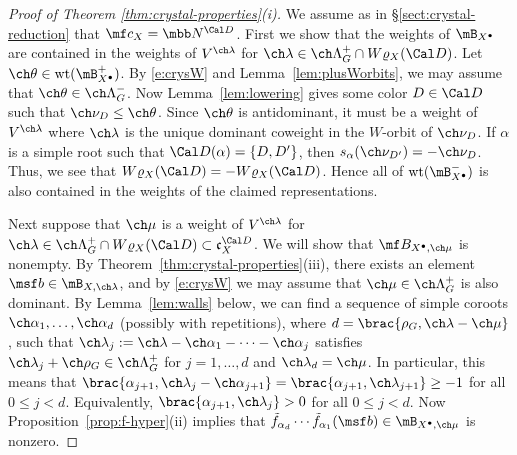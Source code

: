 \begin{proof}[Proof of Theorem \ref{thm:crystal-properties}(i)]
We assume as in \S\ref{sect:crystal-reduction} that $\mf c_X = \mbb N^{\Cal D}$.
First we show that the weights of $\mB_{X^\bullet}$ are contained in the weights of
$V^{\ch\lambda}$ for $\ch\lambda \in \ch\Lambda^+_G \cap W\varrho_X(\Cal D)$.
Let $\ch\theta \in \mathrm{wt}(\mB_{X^\bullet}^+)$.
By \eqref{e:crysW} and Lemma~\ref{lem:plusWorbits},
we may assume that $\ch\theta \in \ch\Lambda^-_G$.
Now Lemma~\ref{lem:lowering} gives some color $D\in \Cal D$ such that
$\ch\nu_D \le \ch\theta$. Since $\ch\theta$ is antidominant,
it must be a weight of $V^{\ch\lambda}$ where $\ch\lambda$ is the unique dominant coweight in
the $W$-orbit of $\ch\nu_D$.
If $\alpha$ is a simple root such that $\Cal D(\alpha) = \{ D, D' \}$, then
$s_\alpha(\ch\nu_{D'}) = -\ch\nu_D$. Thus, we see that
$W\varrho_X(\Cal D) = -W\varrho_X(\Cal D)$. Hence all of $\mathrm{wt}(\mB_{X^\bullet}^-)$
is also contained in the weights of the claimed representations.

Next suppose that $\ch\mu$ is a weight of $V^{\ch\lambda}$ for $\ch\lambda \in \ch\Lambda^+_G \cap W\varrho_X(\Cal D) \subset \mathfrak c_X^{\Cal D}$.
We will show that $\mf B_{X^\bullet,\ch\mu}$ is nonempty.
By Theorem~\ref{thm:crystal-properties}(iii), there exists
an element $\msf b \in \mB_{X,\ch\lambda}$, and
by \eqref{e:crysW} we may assume that
$\ch\mu \in \ch\Lambda^+_G$ is also dominant.
By Lemma~\ref{lem:walls} below,
we can find a sequence of simple coroots $\ch\alpha_1,\dotsc, \ch\alpha_d$
(possibly with repetitions), where $d = \brac{\rho_G,\ch\lambda-\ch\mu}$,
such that $\ch\lambda_j := \ch\lambda-\ch\alpha_1-\dotsb-\ch\alpha_j$
satisfies $\ch\lambda_j + \ch\rho_G \in \ch\Lambda^+_G$
for $j=1,\dotsc,d$ and $\ch\lambda_d = \ch\mu$.
In particular, this means that $\brac{\alpha_{j+1},\ch\lambda_j-\ch\alpha_{j+1}}
= \brac{\alpha_{j+1},\ch\lambda_{j+1}} \ge -1$ for all $0\le j<d$.
Equivalently, $\brac{\alpha_{j+1},\ch\lambda_j} > 0$ for all $0\le j < d$.
Now Proposition~\ref{prop:f-hyper}(ii)
implies that $\tilde f_{\alpha_d} \dotsb \tilde f_{\alpha_1} (\msf b) \in \mB_{X^\bullet,\ch\mu}$
is nonzero.
\end{proof}


